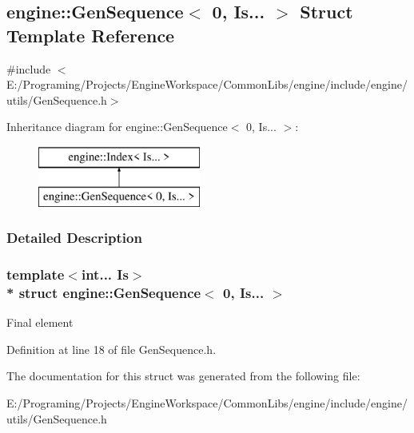 \hypertarget{a00041}{}\subsection{engine\+:\+:Gen\+Sequence$<$ 0, Is... $>$ Struct Template Reference}
\label{a00041}


{\ttfamily \#include $<$E\+:/\+Programing/\+Projects/\+Engine\+Workspace/\+Common\+Libs/engine/include/engine/utils/\+Gen\+Sequence.\+h$>$}

Inheritance diagram for engine\+:\+:Gen\+Sequence$<$ 0, Is... $>$\+:\begin{figure}[H]
\begin{center}
\leavevmode
\includegraphics[height=2.000000cm]{a00041}
\end{center}
\end{figure}


\subsubsection{Detailed Description}
\subsubsection*{template$<$int... Is$>$\\*
struct engine\+::\+Gen\+Sequence$<$ 0, Is... $>$}

Final element 

Definition at line 18 of file Gen\+Sequence.\+h.



The documentation for this struct was generated from the following file\+:\begin{DoxyCompactItemize}
\item 
E\+:/\+Programing/\+Projects/\+Engine\+Workspace/\+Common\+Libs/engine/include/engine/utils/Gen\+Sequence.\+h\end{DoxyCompactItemize}
